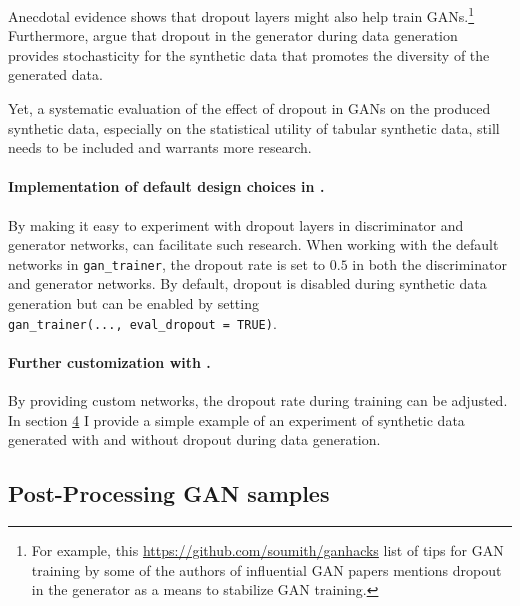 Anecdotal evidence shows that dropout layers might also help train GANs.\footnote{For example, this \url{https://github.com/soumith/ganhacks} list of
  tips for GAN training by some of the authors of influential GAN
  papers \citep{arjovsky2017, radford2016, Denton2015, Zhao2016}
  mentions dropout in the generator as a means to stabilize GAN
  training.} Furthermore, \citet{Isola2016} argue that dropout in the generator during data generation provides stochasticity for the synthetic data that promotes the diversity of the generated data.

Yet, a systematic evaluation of the effect of dropout in GANs on the produced synthetic data, especially on the statistical utility of tabular synthetic data, still needs to be included and warrants more research.

\paragraph{\texorpdfstring{Implementation of default design choices in .}{Implementation of default design choices in .}}\label{implementation-of-default-design-choices-in-.-4}

By making it easy to experiment with dropout layers in discriminator and generator networks,  can facilitate such research. When working with the default networks in \texttt{gan\_trainer}, the dropout rate is set to \(0.5\) in both the discriminator and generator networks. By default, dropout is disabled during synthetic data generation but can be enabled by setting \texttt{gan\_trainer(...,\ eval\_dropout\ =\ TRUE)}.

\paragraph{\texorpdfstring{Further customization with .}{Further customization with .}}\label{further-customization-with-.-4}

By providing custom networks, the dropout rate during training can be adjusted. In section \hyperref[sec:illustrations]{4} I provide a simple example of an experiment of synthetic data generated with and without dropout during data generation.

\subsection{Post-Processing GAN samples}\label{sec:post-process}


